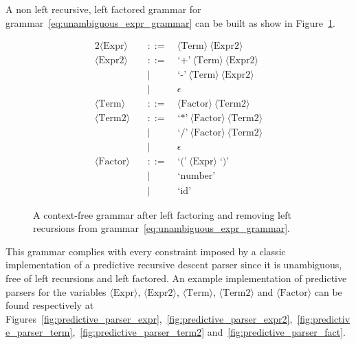 \documentclass[
  oneside,
  english,
  coorientadorbanca,
  embeddedlogo,
  noabntexcite
]{ufsc-thesis-rn46-2019}
\newcommand{\bnfvar}[1]{\ \bnfvars{#1}}
\newcommand{\bnfvars}[1]{\langle\textrm{#1}\rangle}
\newcommand{\bnfter}[1]{\;\bnfters{#1}}
\newcommand{\bnfters}[1]{\textrm{`}\textrm{#1}\textrm{'}}
\newcommand{\bnfprod}[2]{\bnfvars{#1} &\ &::= & #2}
\newcommand{\bnfmore}[1]{ && \mid{} & #1}
\begin{document}
A non left recursive, left factored grammar for grammar~\eqref{eq:unambiguous_expr_grammar} can be built as show in Figure~\ref{fig:fat_expr_grammar}.
\begin{figure}[ht]
  \centering
  \begin{alignat}{2}
    \bnfprod{Expr}{\bnfvar{Term} \bnfvar{Expr2}}              \label{eq:fat_expr_grammar_expr}  \\
    \bnfprod{Expr2}{\bnfter{+}\bnfvar{Term} \bnfvar{Expr2}}   \label{eq:fat_expr_grammar_expr2} \\
    \bnfmore{\bnfter{-}\bnfvar{Term}\bnfvar{Expr2}}           \label{eq:fat_expr_grammar_expr3} \\
    \bnfmore{\ \epsilon}                                      \label{eq:fat_expr_grammar_expr4} \\
    \bnfprod{Term}{\bnfvar{Factor} \bnfvar{Term2}}            \label{eq:fat_expr_grammar_term}  \\
    \bnfprod{Term2}{\bnfter{*}\bnfvar{Factor} \bnfvar{Term2}} \label{eq:fat_expr_grammar_term2} \\
    \bnfmore{\bnfter{/}\bnfvar{Factor}\bnfvar{Term2}}         \label{eq:fat_expr_grammar_term3} \\
    \bnfmore{\ \epsilon}                                      \label{eq:fat_expr_grammar_term4} \\
    \bnfprod{Factor}{\bnfter{(}\bnfvar{Expr}\bnfter{)}}       \label{eq:fat_expr_grammar_fact}  \\
    \bnfmore{\bnfter{number}}                                 \label{eq:fat_expr_grammar_fac2}  \\
    \bnfmore{\bnfter{id}}                                     \label{eq:fat_expr_grammar_fac3}
  \end{alignat}
  \caption{
    A context-free grammar after left factoring and removing left recursions from grammar~\eqref{eq:unambiguous_expr_grammar}.
  }\label{fig:fat_expr_grammar}
\end{figure}
This grammar complies with every constraint imposed by a classic implementation of a predictive recursive descent parser since it is unambiguous, free of left recursions and left factored.
An example implementation of predictive parsers for the variables $\bnfvars{Expr}$, $\bnfvars{Expr2}$, $\bnfvars{Term}$, $\bnfvars{Term2}$ and $\bnfvars{Factor}$ can be found respectively at Figures~\ref{fig:predictive_parser_expr},~\ref{fig:predictive_parser_expr2},~\ref{fig:predictive_parser_term},~\ref{fig:predictive_parser_term2} and~\ref{fig:predictive_parser_fact}.
\end{document}
